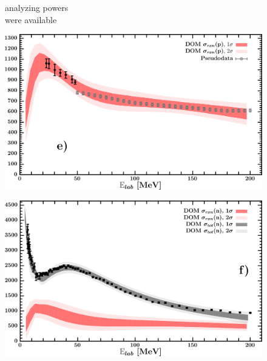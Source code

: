 \documentclass[twocolumn,secnumarabic,amssymb, nobibnotes, aps, prl,
superscriptaddress, nobalancelastpage, draft]{revtex4}
\begin{document}
\begin{figure}[!htb]
\begin{minipage}{0.4\linewidth}
\begin{minipage}[c]{0.45\linewidth}
            analyzing powers \\
            were available
        \end{minipage}
        \label{DOM_ca48_neutron_elastic}
    \end{minipage}
    \centering
    \begin{minipage}{0.4\linewidth}
        \centering
        \includegraphics[width=\linewidth]{figures/ca48_protonInelastic.png}
        \label{DOM_ca48_proton_inelastic}
    \end{minipage}\hspace{6pt}
    \begin{minipage}{0.4\linewidth}
        \centering
        \includegraphics[width=\linewidth]{figures/ca48_neutronInelastic.png}
        \label{DOM_ca48_neutron_inelastic}
    \end{minipage}
    \centering
    \begin{minipage}{0.4\linewidth}
        \centering

\end{minipage}
\end{figure}
\end{document}
